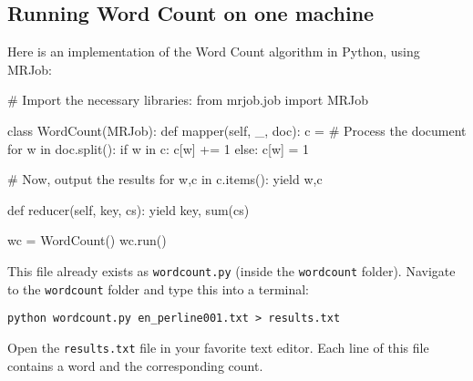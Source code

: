 \subsection{Running Word Count on one machine}

Here is an implementation of the Word Count algorithm in Python, using MRJob:

\begin{python}
# Import the necessary libraries:
from mrjob.job import MRJob

class WordCount(MRJob):
    def mapper(self, _, doc):
        c = {}
        # Process the document
        for w in doc.split():
            if w in c:
                c[w] += 1
            else:
                c[w] = 1

        # Now, output the results
        for w,c in c.items():
            yield w,c

    def reducer(self, key, cs):
        yield key, sum(cs)

wc = WordCount()
wc.run()
\end{python}

This file already exists as \texttt{wordcount.py} (inside the
\texttt{wordcount} folder). Navigate to the \texttt{wordcount} folder and type this into a terminal:

\begin{verbatim}
python wordcount.py en_perline001.txt > results.txt
\end{verbatim}

Open the \texttt{results.txt} file in your favorite text editor. Each line of this file contains a word and the corresponding count.

